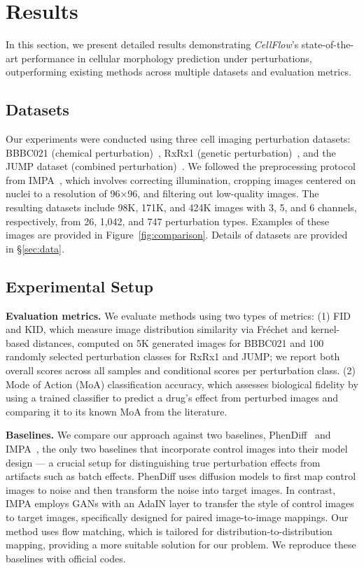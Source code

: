 

\section{Results}
\label{sec:results}

In this section, we present detailed results demonstrating \emph{CellFlow}'s state-of-the-art performance in cellular morphology prediction under perturbations, outperforming existing methods across multiple datasets and evaluation metrics.

\subsection{Datasets}

Our experiments were conducted using three cell imaging perturbation datasets: BBBC021 (chemical perturbation)~\cite{caie2010high}, RxRx1 (genetic perturbation)~\cite{sypetkowski2023rxrx1}, and the JUMP dataset (combined perturbation)~\cite{chandrasekaran2023jump}. We followed the preprocessing protocol from IMPA~\cite{palma2023predicting}, which involves correcting illumination, cropping images centered on nuclei to a resolution of 96×96, and filtering out low-quality images. The resulting datasets include 98K, 171K, and 424K images with 3, 5, and 6 channels, respectively, from 26, 1,042, and 747 perturbation types. Examples of these images are provided in Figure~\ref{fig:comparison}. Details of datasets are provided in \S\ref{sec:data}.

\subsection{Experimental Setup}

\textbf{Evaluation metrics.} We evaluate methods using two types of metrics: (1) FID and KID, which measure image distribution similarity via Fréchet and kernel-based distances, computed on 5K generated images for BBBC021 and 100 randomly selected perturbation classes for RxRx1 and JUMP; we report both overall scores across all samples and conditional scores per perturbation class. (2) Mode of Action (MoA) classification accuracy, which assesses biological fidelity by using a trained classifier to predict a drug’s effect from perturbed images and comparing it to its known MoA from the literature.

\textbf{Baselines.} We compare our approach against two baselines, PhenDiff~\cite{bourou2024phendiff} and IMPA~\cite{palma2023predicting}, the only two baselines that incorporate control images into their model design --- a crucial setup for distinguishing true perturbation effects from artifacts such as batch effects. PhenDiff uses diffusion models to first map control images to noise and then transform the noise into target images. In contrast, IMPA employs GANs with an AdaIN layer to transfer the style of control images to target images, specifically designed for paired image-to-image mappings. Our method uses flow matching, which is tailored for distribution-to-distribution mapping, providing a more suitable solution for our problem. We reproduce these baselines with official codes.

